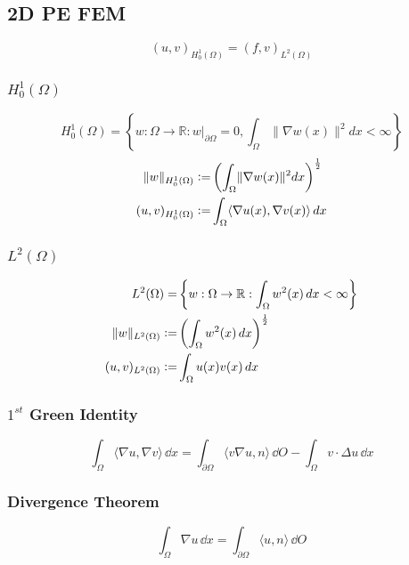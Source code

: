 \subsection{2D PE FEM}
    \vspace{-0.5em}
    $$
        (u,v)_{H_0^1(\Omega)} =  (f,v)_{L^2(\Omega)}
    $$
    \subsubsection{ \texorpdfstring{$H_0^1(\Omega)$}{H01(Omega)}}
        \vspace{-1em}
        $$
        H_0^1(\Omega) =\! \left\{ w\! :\Omega \to \mathbb{R}: w\rvert_{\partial \Omega} = 0, \int_\Omega \lVert \nabla w(x) \rVert^2 dx <\! \infty \right\}
        $$
        \begin{align*}
            \lVert w \rVert_{H_0^1(\Omega)} \vcentcolon=& \left( \int_\Omega \lVert \nabla w (x) \rVert^2 dx \right)^{\frac{1}{2}}\\
            (u,v)_{H_0^1(\Omega)} \vcentcolon=& \int_\Omega \langle\nabla u(x) , \nabla v(x) \rangle\, dx
        \end{align*}
    \subsubsection{ \texorpdfstring{$L^2(\Omega)$}{L2(Omega)}}
        \vspace{-1em}
        \begin{align*}
            L^2(\Omega) =& \left\{ w:  \Omega \to \mathbb{R}: \int_\Omega w^2(x)\, dx < \infty \right\}\\
            \lVert w \rVert_{L^2(\Omega)} \vcentcolon=& \left( \int_\Omega w^2 (x)\, dx \right)^{\frac{1}{2}}\\
            (u,v)_{L^2(\Omega)} \vcentcolon=& \int_\Omega u(x) v(x) \, dx
        \end{align*}
    \subsubsection{ \texorpdfstring{$1^{st}$}{first} Green Identity}
        \vspace{-1em}
        $$  
            \int_\Omega \langle \nabla u, \nabla v \rangle \, \dd x = \int_{\partial \Omega} \langle v \nabla u, n \rangle \, \dd O - \int_\Omega v \cdot \Delta u \, \dd x
        $$
    \subsubsection{Divergence Theorem}
        \vspace{-0.5em}
        $$
            \int_\Omega \nabla u \, \dd x = \int_{\partial\Omega} \langle u , n \rangle \, \dd O
        $$
    \vfill \null \columnbreak
